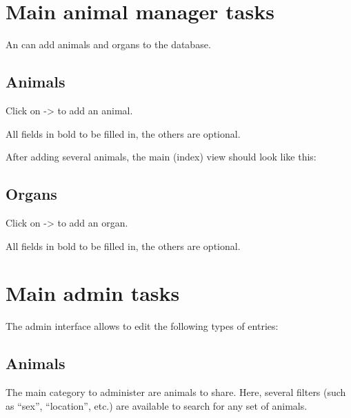 \documentclass[letterpaper,10pt,openany,oneside,english]{sphinxmanual}
\begin{document}
\noindent{}


\section{Main animal manager tasks}
\label{\detokenize{index:main-animal-manager-tasks}}
An  can add animals and organs to the database.

\noindent{}


\subsection{Animals}
\label{\detokenize{index:id1}}
Click on  -\textgreater{}  to add an animal.

\noindent{}

All fields in bold  to be filled in, the others are optional.

After adding several animals, the main (index) view should look like this:

\noindent{}


\subsection{Organs}
\label{\detokenize{index:id2}}
Click on  -\textgreater{}  to add an organ.

\noindent{}

All fields in bold  to be filled in, the others are optional.


\section{Main admin tasks}
\label{\detokenize{index:main-admin-tasks}}
The admin interface allows to edit the following types of entries:

\noindent{}


\subsection{Animals}
\label{\detokenize{index:id3}}
The main category to administer are animals to share.
Here, several filters (such as “sex”, “location”, etc.) are available to search for any set of animals.
\end{document}

